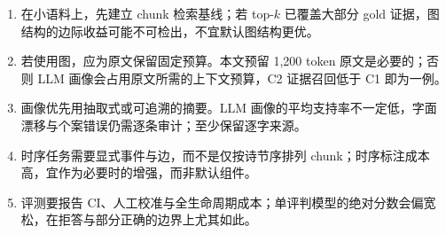 \begin{enumerate}
\item 在小语料上，先建立 chunk 检索基线；若 top-$k$ 已覆盖大部分 gold 证据，图结构的边际收益可能不可检出，不宜默认图结构更优。
\item 若使用图，应为原文保留固定预算。本文预留 1,200 token 原文是必要的；否则 LLM 画像会占用原文所需的上下文预算，C2 证据召回低于 C1 即为一例。
\item 画像优先用抽取式或可追溯的摘要。LLM 画像的平均支持率不一定低，字面漂移与个案错误仍需逐条审计；至少保留逐字来源。
\item 时序任务需要显式事件与边，而不是仅按诗节序排列 chunk；时序标注成本高，宜作为必要时的增强，而非默认组件。
\item 评测要报告 CI、人工校准与全生命周期成本；单评判模型的绝对分数会偏宽松，在拒答与部分正确的边界上尤其如此。
\end{enumerate}